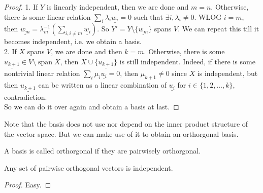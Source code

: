 \begin{proof}
    1. If $Y$ is linearly independent, then we are done and $m=n$.
    Otherwise, there is some linear relation $\sum_i\lambda_i\underline{w_i}=0$ such that $\exists i, \lambda_i\neq 0$.
    WLOG $i=m$, then $\underline{w_m}=\lambda_m^{-1}(\sum_{i,i\neq m}\underline{w_i})$.
    So $Y'=Y\setminus\{\underline{w_m}\}$ spans $V$.
    We can repeat this till it becomes independent, i.e. we obtain a basis.\\
    2. If $X$ spans $V$, we are done and then $k=m$.
    Otherwise, there is some $\underline{u_{k+1}}\in V\setminus\operatorname{span}X$, then $X\cup\{\underline{u_{k+1}}\}$ is still independent.
    Indeed, if there is some nontrivial linear relation $\sum_i\mu_i\underline{u_i}=0$, then $\mu_{k+1}\neq 0$ since $X$ is independent, but then $\underline{u_{k+1}}$ can be written as a linear combination of $\underline{u_i}$ for $i\in\{1,2,\ldots,k\}$, contradiction.\\
    So we can do it over again and obtain a basis at last.
\end{proof}
Note that the basis does not use nor depend on the inner product structure of the vector space.
But we can make use of it to obtain an orthorgonal basis.
\begin{definition}
    A basis is called orthorgonal if they are pairwisely orthorgonal.
\end{definition}
\begin{proposition}
    Any set of pairwise orthogonal vectors is independent.
\end{proposition}
\begin{proof}
    Easy.
\end{proof}
